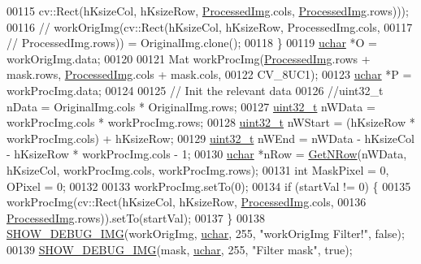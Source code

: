\begin{DoxyCode}
00115         cv::Rect(hKsizeCol, hKsizeRow, \hyperlink{class_vision_1_1_image_processing_aa7d65742882cd1b2a1e4e9cb68809211}{ProcessedImg}.cols, 
      \hyperlink{class_vision_1_1_image_processing_aa7d65742882cd1b2a1e4e9cb68809211}{ProcessedImg}.rows)));
00116     \textcolor{comment}{// workOrigImg(cv::Rect(hKsizeCol, hKsizeRow, ProcessedImg.cols,}
00117     \textcolor{comment}{// ProcessedImg.rows)) = OriginalImg.clone();}
00118   \}
00119   \hyperlink{_soil_math_types_8h_a65f85814a8290f9797005d3b28e7e5fc}{uchar} *O = workOrigImg.data;
00120 
00121   Mat workProcImg(\hyperlink{class_vision_1_1_image_processing_aa7d65742882cd1b2a1e4e9cb68809211}{ProcessedImg}.rows + mask.rows, \hyperlink{class_vision_1_1_image_processing_aa7d65742882cd1b2a1e4e9cb68809211}{ProcessedImg}.cols + mask.cols,
00122                   CV\_8UC1);
00123   \hyperlink{_soil_math_types_8h_a65f85814a8290f9797005d3b28e7e5fc}{uchar} *P = workProcImg.data;
00124 
00125   \textcolor{comment}{// Init the relevant data}
00126   \textcolor{comment}{//uint32\_t nData = OriginalImg.cols * OriginalImg.rows;}
00127   \hyperlink{_soil_math_types_8h_a435d1572bf3f880d55459d9805097f62}{uint32\_t} nWData = workProcImg.cols * workProcImg.rows;
00128   \hyperlink{_soil_math_types_8h_a435d1572bf3f880d55459d9805097f62}{uint32\_t} nWStart = (hKsizeRow * workProcImg.cols) + hKsizeRow;
00129   \hyperlink{_soil_math_types_8h_a435d1572bf3f880d55459d9805097f62}{uint32\_t} nWEnd = nWData - hKsizeCol - hKsizeRow * workProcImg.cols - 1;
00130   \hyperlink{_soil_math_types_8h_a65f85814a8290f9797005d3b28e7e5fc}{uchar} *nRow = \hyperlink{class_vision_1_1_image_processing_a56e17515a15eb7d246985e550fc89610}{GetNRow}(nWData, hKsizeCol, workProcImg.cols, workProcImg.rows);
00131   \textcolor{keywordtype}{int} MaskPixel = 0, OPixel = 0;
00132 
00133   workProcImg.setTo(0);
00134   \textcolor{keywordflow}{if} (startVal != 0) \{
00135     workProcImg(cv::Rect(hKsizeCol, hKsizeRow, \hyperlink{class_vision_1_1_image_processing_aa7d65742882cd1b2a1e4e9cb68809211}{ProcessedImg}.cols,
00136                          \hyperlink{class_vision_1_1_image_processing_aa7d65742882cd1b2a1e4e9cb68809211}{ProcessedImg}.rows)).setTo(startVal);
00137   \}
00138   \hyperlink{_vision_debug_8h_aae864fa4f990213a4184a209ff236202}{SHOW\_DEBUG\_IMG}(workOrigImg, \hyperlink{_soil_math_types_8h_a65f85814a8290f9797005d3b28e7e5fc}{uchar}, 255, \textcolor{stringliteral}{"workOrigImg Filter!"}, \textcolor{keyword}{false});
00139   \hyperlink{_vision_debug_8h_aae864fa4f990213a4184a209ff236202}{SHOW\_DEBUG\_IMG}(mask, \hyperlink{_soil_math_types_8h_a65f85814a8290f9797005d3b28e7e5fc}{uchar}, 255, \textcolor{stringliteral}{"Filter mask"}, \textcolor{keyword}{true});

\end{DoxyCode}
